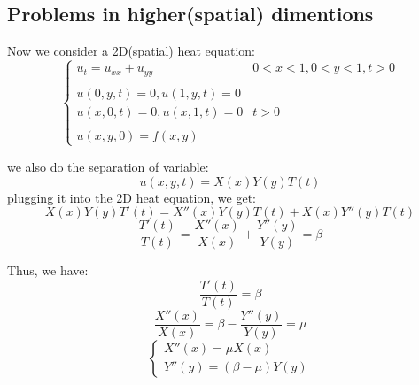\documentclass[12pt]{article} %
\begin{document}
\subsection{Problems in higher(spatial) dimentions}
\hspace{5mm}
Now we consider a 2D(spatial) heat equation:
\begin{equation}
\left\{
\begin{array}{lll}
u_{t} = u_{xx} + u_{yy} & 0<x<1, 0<y<1, t>0\\
 \\
 u(0, y, t)=0,  u(1, y, t)=0 \\
  u(x, 0, t)=0,  u(x, 1, t)=0 & t >0 \\ \\
 u(x, y, 0) = f(x, y)
\end{array}\right.
\end{equation}\par
we also do the separation of variable:
$$
u(x, y, t) = X(x)Y(y)T(t)
$$plugging it into the 2D heat equation, we get:
$$
X(x)Y(y)T'(t) = X''(x)Y(y)T(t) + X(x)Y''(y)T(t)
$$
$$
\frac{T'(t)}{T(t)}= \frac{X''(x)}{X(x)}+\frac{Y''(y)}{Y(y)} = \beta
$$\par
Thus, we have:
\begin{equation}
\frac{T'(t)}{T(t)}= \beta
\end{equation}
$$
\frac{X''(x)}{X(x)}= \beta - \frac{Y''(y)}{Y(y)} = \mu
$$
\begin{equation}
\left\{
\begin{array}{lll}
X''(x) = \mu X(x)\\
Y''(y) = (\beta - \mu)Y(y)
\end{array}\right.
\end{equation}
\end{document}
